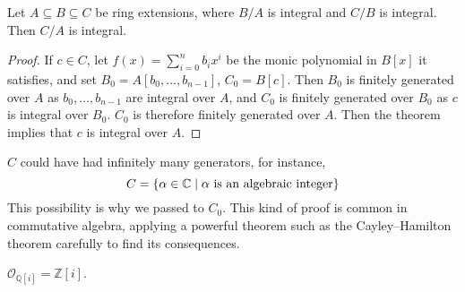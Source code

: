 \begin{corollary}
    Let \( A \subseteq B \subseteq C \) be ring extensions, where \( B / A \) is integral and \( C / B \) is integral.
    Then \( C / A \) is integral.
\end{corollary}
\begin{proof}
    If \( c \in C \), let \( f(x) = \sum_{i=0}^n b_i x^i \) be the monic polynomial in \( B[x] \) it satisfies, and set \( B_0 = A[b_0, \dots, b_{n-1}] \), \( C_0 = B[c] \).
    Then \( B_0 \) is finitely generated over \( A \) as \( b_0, \dots, b_{n-1} \) are integral over \( A \), and \( C_0 \) is finitely generated over \( B_0 \) as \( c \) is integral over \( B_0 \).
    \( C_0 \) is therefore finitely generated over \( A \).
    Then the theorem implies that \( c \) is integral over \( A \).
\end{proof}
\begin{remark}
    \( C \) could have had infinitely many generators, for instance,
    \[ C = \qty{\alpha \in \mathbb C \mid \alpha \text{ is an algebraic integer}} \]
    This possibility is why we passed to \( C_0 \).
    This kind of proof is common in commutative algebra, applying a powerful theorem such as the Cayley--Hamilton theorem carefully to find its consequences.
\end{remark}
\begin{example}
    \( \mathcal O_{\mathbb Q[i]} = \mathbb Z[i] \).
\end{example}

